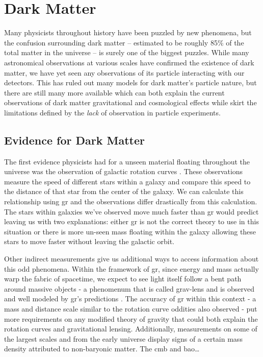 \chapter{Dark Matter}
\label{chapter:dm}

Many physicists throughout history have been puzzled by new phenomena, but the
confusion surrounding dark matter -- estimated to be roughly 85\% of the total
matter in the universe -- is surely one of the biggest puzzles. While many
astronomical observations at various scales have confirmed the existence of
dark matter, we have yet seen any observations of its particle interacting
with our detectors. This has ruled out many models for dark matter's particle
nature, but there are still many more available which can both explain the
current observations of dark matter gravitational and cosmological effects
while skirt the limitations defined by the \emph{lack} of observation in
particle experiments.

\section{Evidence for Dark Matter}

The first evidence physicists had for a unseen material floating throughout the universe
was the observation of galactic rotation curves \cite{rubin-rotationcurve-1980,rotationcurve-2000}.
These observations measure the speed of different stars within a galaxy and compare this speed to
the distance of that star from the center of the galaxy. We can calculate this relationship
using \gls{gr}  and the
observations differ drastically from this calculation. The stars within galaxies we've observed move
much faster than \gls{gr} would predict leaving us with two explanations: either \gls{gr} is not the correct theory
to use in this situation or there is more un-seen mass floating within the galaxy allowing these stars
to move faster without leaving the galactic orbit.

Other indirect measurements give us additional ways to access information about this odd phenomena.
Within the framework of \gls{gr}, since energy and mass actually warp the fabric of spacetime,
we expect to see light itself follow a bent path around massive objects - a phenomenum that is called
\gls{grav-lens} and is observed and well modeled by \gls{gr}'s predictions \cite{gravlensing-2004}.
The accuracy of \gls{gr} within this context - a mass and distance scale similar to the rotation curve oddities also observed -
put more requirements on any modified theory of gravity that could both explain the rotation curves and gravitational lensing.
Additionally, measurements on some of the largest scales and from the early universe
display signs of a certain mass density attributed to non-baryonic matter.
The \gls{cmb} and \gls{bao}\dots

